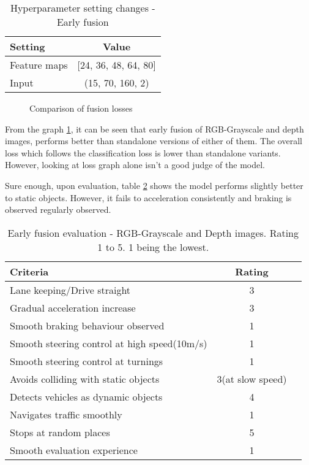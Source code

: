 \begin{table}[!ht]
    \centering
\begin{tabular}{lc}
    \toprule
    Setting  & Value  \\\midrule
    Feature maps  & [24, 36, 48, 64, 80]  \\
    Input  & (15, 70, 160, 2)\\\bottomrule
\end{tabular}
\caption{Hyperparameter setting changes - Early fusion}
\label{table:paramsEF}
\end{table}
\begin{figure}[!ht]
    \centering
    \def\svgwidth{\textwidth}
    
    \caption{Comparison of fusion losses}
    \label{fig:datafusionlosses1}
\end{figure}
From the graph \ref{fig:datafusionlosses1}, it can be seen that early fusion of
RGB-Grayscale and depth images, performs better than standalone versions of either of
them. The overall loss which follows the classification loss is lower than standalone
variants. However, looking at loss graph alone isn't a good judge of the model.

Sure enough, upon evaluation, table \ref{table:earlyfusionrgbdepth} shows the model
performs slightly better to static objects. However, it fails to acceleration consistently
and braking is observed regularly observed.
\begin{table}[!ht]
    \centering
\begin{tabular}{lcc}
    \toprule
    Criteria & Rating \\\midrule
    Lane keeping/Drive straight  & 3  \\
    Gradual acceleration increase  & 3\\
    Smooth braking behaviour observed & 1 \\
    Smooth steering control at high speed(10m/s) & 1 \\
    Smooth steering control at turnings & 1\\
    Avoids colliding with static objects & 3(at slow speed) \\
    Detects vehicles as dynamic objects & 4 \\
    Navigates traffic smoothly & 1\\
    Stops at random places & 5 \\
    Smooth evaluation experience & 1 \\\bottomrule
\end{tabular}
\caption{Early fusion evaluation - RGB-Grayscale and Depth images. Rating 1 to 5. 1 being
the lowest.}
\label{table:earlyfusionrgbdepth}
\end{table}


